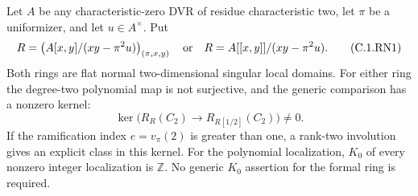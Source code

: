 \begin{theorem}
\label{C:ramified_exponent_two_node}
Let $A$ be any characteristic-zero DVR of residue characteristic two,
let $\pi$ be a uniformizer, and let $u\in A^\times$. Put
\[
 R=\left(A[x,y]/(xy-\pi^2u)\right)_{(\pi,x,y)}
 \quad\hbox{or}\quad
 R=A[[x,y]]/(xy-\pi^2u).                              \tag{C.1.RN1}
\]
Both rings are flat normal two-dimensional singular local domains.
For either ring the degree-two polynomial map is not surjective,
and the generic comparison has a nonzero kernel:
\[
 \ker\bigl(R_R(C_2)\longrightarrow R_{R[1/2]}(C_2)\bigr)\ne0.
                                                               \tag{C.1.RN2}
\]
If the ramification index $e=v_\pi(2)$ is greater than one,
a rank-two involution gives an explicit class in this kernel.
For the polynomial localization, $K_0$ of every nonzero integer
localization is $\mathbb Z$. No generic $K_0$ assertion for the
formal ring is required.
\end{theorem}
